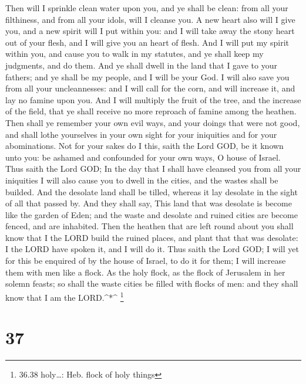  Then will I sprinkle clean water upon you, and ye shall be
clean: from all your filthiness, and from all your idols, will I cleanse
you.  A new heart also will I give you, and a new spirit
will I put within you: and I will take away the stony heart out of your
flesh, and I will give you an heart of flesh.  And I will
put my spirit within you, and cause you to walk in my statutes, and ye
shall keep my judgments, and do them.  And ye shall dwell
in the land that I gave to your fathers; and ye shall be my people, and
I will be your God.  I will also save you from all your
uncleannesses: and I will call for the corn, and will increase it, and
lay no famine upon you.  And I will multiply the fruit of
the tree, and the increase of the field, that ye shall receive no more
reproach of famine among the heathen.  Then shall ye
remember your own evil ways, and your doings that were not good, and
shall lothe yourselves in your own sight for your iniquities and for
your abominations.  Not for your sakes do I this, saith the
Lord GOD, be it known unto you: be ashamed and confounded for your own
ways, O house of Israel.  Thus saith the Lord GOD; In the
day that I shall have cleansed you from all your iniquities I will also
cause you to dwell in the cities, and the wastes shall be builded.
 And the desolate land shall be tilled, whereas it lay
desolate in the sight of all that passed by.  And they
shall say, This land that was desolate is become like the garden of
Eden; and the waste and desolate and ruined cities are become fenced,
and are inhabited.  Then the heathen that are left round
about you shall know that I the LORD build the ruined places, and plant
that that was desolate: I the LORD have spoken it, and I will do it.
 Thus saith the Lord GOD; I will yet for this be enquired
of by the house of Israel, to do it for them; I will increase them with
men like a flock.  As the holy flock, as the flock of
Jerusalem in her solemn feasts; so shall the waste cities be filled with
flocks of men: and they shall know that I am the LORD.\^{}*\^{}
\footnote{36.38 holy\ldots: Heb. flock of holy things}

\hypertarget{section-36}{%
\section{37}\label{section-36}}

